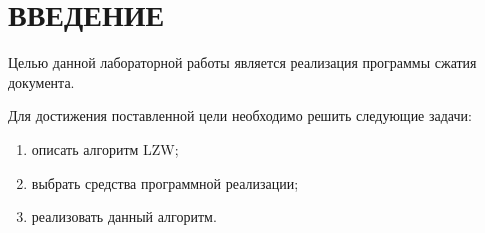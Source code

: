 \chapter*{ВВЕДЕНИЕ}

Целью данной лабораторной работы является реализация программы сжатия документа.

Для достижения поставленной цели необходимо решить следующие задачи:

\begin{enumerate}[label={\arabic*)}]
	\item описать алгоритм LZW;
	\item выбрать средства программной реализации;
	\item реализовать данный алгоритм.
\end{enumerate}